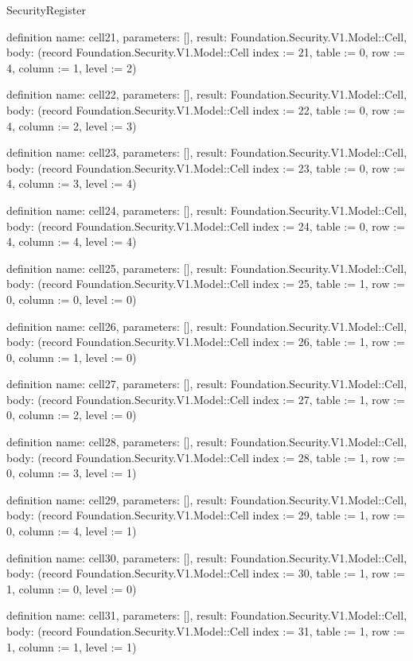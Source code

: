 \begin{lexlean}{SecurityRegister}
\begin{semanticmodule}
definition{
  name: cell21,
  parameters: [],
  result: Foundation.Security.V1.Model::Cell,
  body: (record Foundation.Security.V1.Model::Cell {index := 21, table := 0, row := 4, column := 1, level := 2})
}

definition{
  name: cell22,
  parameters: [],
  result: Foundation.Security.V1.Model::Cell,
  body: (record Foundation.Security.V1.Model::Cell {index := 22, table := 0, row := 4, column := 2, level := 3})
}

definition{
  name: cell23,
  parameters: [],
  result: Foundation.Security.V1.Model::Cell,
  body: (record Foundation.Security.V1.Model::Cell {index := 23, table := 0, row := 4, column := 3, level := 4})
}

definition{
  name: cell24,
  parameters: [],
  result: Foundation.Security.V1.Model::Cell,
  body: (record Foundation.Security.V1.Model::Cell {index := 24, table := 0, row := 4, column := 4, level := 4})
}

definition{
  name: cell25,
  parameters: [],
  result: Foundation.Security.V1.Model::Cell,
  body: (record Foundation.Security.V1.Model::Cell {index := 25, table := 1, row := 0, column := 0, level := 0})
}

definition{
  name: cell26,
  parameters: [],
  result: Foundation.Security.V1.Model::Cell,
  body: (record Foundation.Security.V1.Model::Cell {index := 26, table := 1, row := 0, column := 1, level := 0})
}

definition{
  name: cell27,
  parameters: [],
  result: Foundation.Security.V1.Model::Cell,
  body: (record Foundation.Security.V1.Model::Cell {index := 27, table := 1, row := 0, column := 2, level := 0})
}

definition{
  name: cell28,
  parameters: [],
  result: Foundation.Security.V1.Model::Cell,
  body: (record Foundation.Security.V1.Model::Cell {index := 28, table := 1, row := 0, column := 3, level := 1})
}

definition{
  name: cell29,
  parameters: [],
  result: Foundation.Security.V1.Model::Cell,
  body: (record Foundation.Security.V1.Model::Cell {index := 29, table := 1, row := 0, column := 4, level := 1})
}

definition{
  name: cell30,
  parameters: [],
  result: Foundation.Security.V1.Model::Cell,
  body: (record Foundation.Security.V1.Model::Cell {index := 30, table := 1, row := 1, column := 0, level := 0})
}

definition{
  name: cell31,
  parameters: [],
  result: Foundation.Security.V1.Model::Cell,
  body: (record Foundation.Security.V1.Model::Cell {index := 31, table := 1, row := 1, column := 1, level := 1})
}


\end{semanticmodule}
\end{lexlean}
